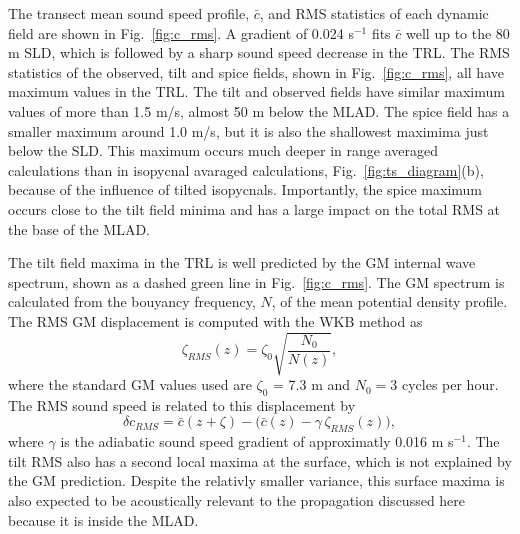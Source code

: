 \documentclass[preprint,NumberedRefs]{JASA}
\begin{document}
The transect mean sound speed profile, $\bar{c}$, and RMS statistics of each dynamic field are shown in Fig.~\ref{fig:c_rms}. A gradient of 0.024 s$^{-1}$ fits $\bar{c}$ well up to the 80 m SLD, which is followed by a sharp sound speed decrease in the TRL. The RMS statistics of the observed, tilt and spice fields, shown in Fig.~\ref{fig:c_rms}, all have maximum values in the TRL. The tilt and observed fields have similar maximum values of more than 1.5 m/s, almost 50 m below the MLAD. The spice field has a smaller maximum around 1.0 m/s, but it is also the shallowest maximima just below the SLD. This maximum occurs much deeper in range averaged calculations than in isopycnal avaraged calculations, Fig.~\ref{fig:ts_diagram}(b), because of the influence of tilted isopycnals.\citep{ferrari2000} Importantly, the spice maximum occurs close to the tilt field minima and has a large impact on the total RMS at the base of the MLAD.

The tilt field maxima in the TRL is well predicted by the GM internal wave spectrum, shown as a dashed green line in Fig.~\ref{fig:c_rms}. The GM spectrum is calculated from the bouyancy frequency, $N$, of the mean potential density profile. The RMS GM displacement is computed with the WKB method as
\begin{equation*}
    \zeta_{RMS}(z) = \zeta_0 \sqrt{\frac{N_0}{N(z)}},
\end{equation*}
where the standard GM values used are $\zeta_0$ = 7.3 m and $N_0=3$ cycles per hour. The RMS sound speed is related to this displacement by
\begin{equation*}
    \delta c_{RMS} = \bar{c}(z+\zeta)-\big(\bar{c}(z) - \gamma \, \zeta_{RMS}(z)\big),
\end{equation*}
where $\gamma$ is the adiabatic sound speed gradient of approximatly 0.016 m s$^{-1}$. The tilt RMS also has a second local maxima at the surface, which is not explained by the GM prediction. Despite the relativly smaller variance, this surface maxima is also expected to be acoustically relevant to the propagation discussed here because it is inside the MLAD.
\end{document}

